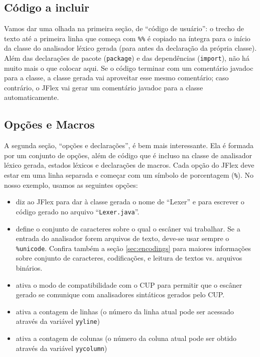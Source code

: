 \documentclass[11pt]{scrartcl}
\begin{document}
\subsection{C\'odigo a incluir\label{ExampleUserCode}}
Vamos dar uma olhada na primeira se\c{c}\~ao, de ``c\'odigo de usu\'ario'': o trecho de texto
at\'e a primeira linha que come\c{c}a com \texttt{\%\%} \'e copiado na \'integra para o in\'icio
da classe do analisador l\'exico gerada (para antes da declara\c{c}\~ao da pr\'opria classe). 
Al\'em das declara\c{c}\~oes de pacote (\texttt{package}) e das depend\^encias (\texttt{import}), n\~ao h\'a muito mais o que colocar aqui.
Se o c\'odigo terminar com um coment\'ario javadoc para a classe, a classe gerada vai
aproveitar esse mesmo coment\'ario; caso contr\'ario, o JFlex vai gerar um coment\'ario javadoc para a classe automaticamente.

\subsection{Op\c{c}\~oes e Macros\label{ExampleOptions}}
A segunda se\c{c}\~ao, ``op\c{c}\~oes e declara\c{c}\~oes'', \'e bem mais interessante. Ela \'e formada
por um conjunto de op\c{c}\~oes, al\'em de c\'odigo que \'e incluso na classe de analisador l\'exico gerada, estados l\'exicos
e declara\c{c}\~oes de macros. Cada op\c{c}\~ao do JFlex deve estar em uma linha separada e come\c{c}ar com um s\'imbolo de porcentagem (\texttt{\%}).
No nosso exemplo, usamos as seguintes op\c{c}\~oes:

\begin{itemize}
\item
  \texttt{} diz ao JFlex para dar \`a classe gerada o nome de 
  ``Lexer'' e para escrever o c\'odigo gerado no arquivo ``\texttt{Lexer.java}''.

\item
  \texttt{} define o conjunto de caracteres sobre o qual o esc\^aner vai trabalhar. 
  Se a entrada do analisador forem arquivos de texto, deve-se usar sempre o \texttt{\%unicode}. Confira tamb\'em
  a se\c{c}\~ao \ref{sec:encodings} para maiores informa\c{c}\~oes sobre conjunto de caracteres, codifica\c{c}\~oes,
  e leitura de textos vs. arquivos bin\'arios.

\item
  \texttt{} ativa o modo de compatibilidade com o CUP
  para permitir que o esc\^aner gerado se comunique com analisadores sint\'aticos gerados pelo CUP.

\item
  \texttt{} ativa a contagem de linhas (o n\'umero da linha
  atual pode ser acessado atrav\'es da vari\'avel \texttt{yyline})

\item
  \texttt{} ativa a contagem de colunas
  (o n\'umero da coluna atual pode ser obtido atrav\'es da vari\'avel \texttt{yycolumn})

\end{itemize}
\label{ExampleScannerCode}
\end{document}
